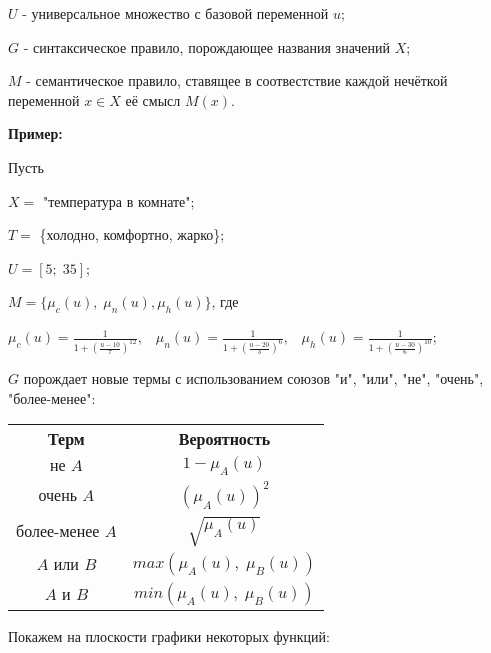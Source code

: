 \documentclass[18pt, a4paper]{extarticle}
\newcommand{\primer}{\textbf{Пример:\;}}
\begin{document}
$U$ - универсальное множество с базовой переменной $u$;

$G$ - синтаксическое правило, порождающее названия значений $X$;

$M$ - семантическое правило, ставящее в соотвестствие каждой нечёткой переменной $x\in X$ её смысл $M(x)$.

\primer

Пусть

$X=$ "температура в комнате"{};

$T=$ \{холодно, комфортно, жарко\};

$U=[5;\;35]$;

$M=\{\mu_c(u),\;\mu_n(u), \mu_h(u)\}$, где

$\mu_c(u)=\frac{1}{1+(\frac{u-10}{7})^{12}},\;\;\;\mu_n(u)=\frac{1}{1+(\frac{u-20}{3})^{6}},\;\;\;\mu_h(u)=\frac{1}{1+(\frac{u-30}{6})^{10}}$;

$G$ порождает новые термы с использованием союзов "и"{}, "или"{}, "не"{}, "очень"{}, "более-менее"{}:

\begin{center}
\begin{tabular}{|c|c|}
\cline{1-2}
\textbf{Терм} & \textbf{Вероятность} \\
\cline{1-2}
$\textbf{не }A$ & $1-\mu_A(u)$ \\
\cline{1-2}
$\textbf{очень }A$ & $(\mu_A(u))^2$ \\
\cline{1-2}
$\textbf{более-менее }A$ & $\sqrt{\mu_A(u)}$ \\
\cline{1-2}
$A\textbf{ или }B$ & $max(\mu_A(u),\;\mu_B(u))$ \\
\cline{1-2}
$A\textbf{ и }B$ & $min(\mu_A(u),\;\mu_B(u))$ \\
\cline{1-2}
\end{tabular}
\end{center}

\newpage

Покажем на плоскости графики некоторых функций:
\end{document}
